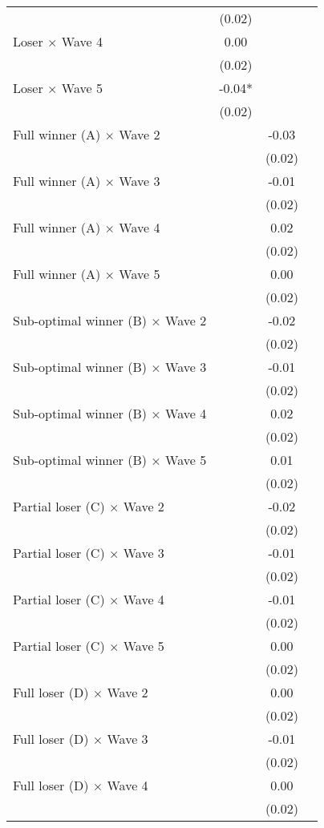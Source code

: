 \begin{table}
\begin{tabular}[t]{lccc}
 & (0.02) &  \vphantom{2} & \\
Loser × Wave 4 & 0.00 &  & \\
 & (0.02) &  \vphantom{1} & \\
Loser × Wave 5 & -0.04* &  & \\
 & (0.02) &  & \\
Full winner (A) × Wave 2 &  & -0.03 & \\
 &  & (0.02) \vphantom{15} & \\
Full winner (A) × Wave 3 &  & -0.01 & \\
 &  & (0.02) \vphantom{14} & \\
Full winner (A) × Wave 4 &  & 0.02 & \\
 &  & (0.02) \vphantom{13} & \\
Full winner (A) × Wave 5 &  & 0.00 & \\
 &  & (0.02) \vphantom{12} & \\
Sub-optimal winner (B) × Wave 2 &  & -0.02 & \\
 &  & (0.02) \vphantom{11} & \\
Sub-optimal winner (B) × Wave 3 &  & -0.01 & \\
 &  & (0.02) \vphantom{10} & \\
Sub-optimal winner (B) × Wave 4 &  & 0.02 & \\
 &  & (0.02) \vphantom{9} & \\
Sub-optimal winner (B) × Wave 5 &  & 0.01 & \\
 &  & (0.02) \vphantom{8} & \\
Partial loser (C) × Wave 2 &  & -0.02 & \\
 &  & (0.02) \vphantom{7} & \\
Partial loser (C) × Wave 3 &  & -0.01 & \\
 &  & (0.02) \vphantom{6} & \\
Partial loser (C) × Wave 4 &  & -0.01 & \\
 &  & (0.02) \vphantom{5} & \\
Partial loser (C) × Wave 5 &  & 0.00 & \\
 &  & (0.02) \vphantom{4} & \\
Full loser (D) × Wave 2 &  & 0.00 & \\
 &  & (0.02) \vphantom{3} & \\
Full loser (D) × Wave 3 &  & -0.01 & \\
 &  & (0.02) \vphantom{2} & \\
Full loser (D) × Wave 4 &  & 0.00 & \\
 &  & (0.02) \vphantom{1} & \\

\end{tabular}
\end{table}
